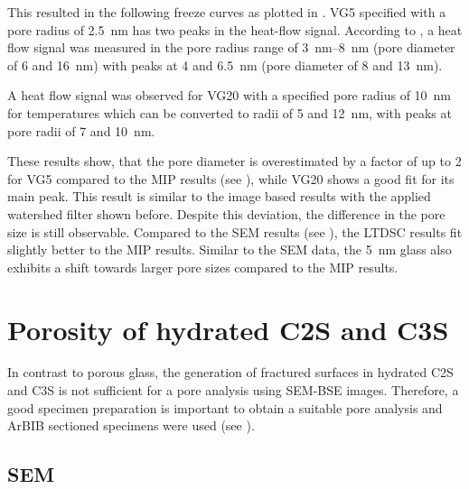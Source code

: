 This resulted in the following freeze curves as plotted in .
\acs{VG5} specified with a pore radius of \qty{2.5}{\nano\meter} has two peaks in the heat-flow signal.
According to  \cite{brun.1977}, a heat flow signal was measured in the pore radius range of \qtyrange{3}{8}{\nano\meter} (pore diameter of \num{6} and \qty{16}{\nano\meter}) with peaks at \num{4} and \qty{6.5}{\nano\meter} (pore diameter of \num{8} and \qty{13}{\nano\meter}).

A heat flow signal was observed for \acs{VG20} with a specified pore radius of \qty{10}{\nano\meter} for temperatures which can be converted to radii of \num{5} and \qty{12}{\nano\meter}, with peaks at pore radii of \num{7} and \qty{10}{\nano\meter}.

These results show, that the pore diameter is overestimated by a factor of up to \num{2} for \acs{VG5} compared to the \ac{MIP} results (see ), while \acs{VG20} shows a good fit for its main peak.
This result is similar to the image based results with the applied watershed filter shown before.
Despite this deviation, the difference in the pore size is still observable.
Compared to the \ac{SEM} results (see ), the \ac{LTDSC} results fit slightly better to the \ac{MIP} results.
Similar to the \ac{SEM} data, the \qty{5}{\nano\meter} glass also exhibits a shift towards larger pore sizes compared to the \ac{MIP} results.







\FloatBarrier
\section{Porosity of hydrated \acs*{C2S} and \acs*{C3S}}

In contrast to porous glass, the generation of fractured surfaces in hydrated \ac{C2S} and \ac{C3S} is not sufficient for a pore analysis using \ac{SEM}-\ac{BSE} images.
Therefore, a good specimen preparation is important to obtain a suitable pore analysis and \ac{ArBIB} sectioned specimens were used (see ).

\subsection{\acs*{SEM}}
\label{subsec:pores_C3S_SEM}

